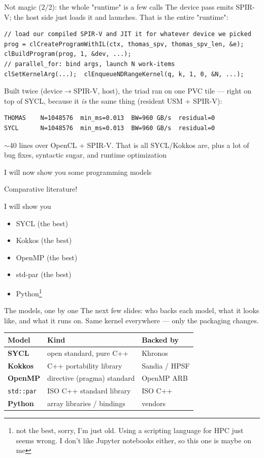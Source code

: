 \begin{frame}[fragile]{Not magic (2/2): the whole "runtime" is a few calls}
The device pass emits SPIR-V; the host side just loads it and launches. That is the
entire "runtime":
\begin{verbatim}
// load our compiled SPIR-V and JIT it for whatever device we picked
prog = clCreateProgramWithIL(ctx, thomas_spv, thomas_spv_len, &e);
clBuildProgram(prog, 1, &dev, ...);
// parallel_for: bind args, launch N work-items
clSetKernelArg(...);  clEnqueueNDRangeKernel(q, k, 1, 0, &N, ...);
\end{verbatim}
Built twice (device$\rightarrow$SPIR-V, host), the triad ran on one PVC tile ---
right on top of SYCL, because it \emph{is} the same thing (resident USM + SPIR-V):
\begin{verbatim}
THOMAS    N=1048576  min_ms=0.013  BW=960 GB/s  residual=0
SYCL      N=1048576  min_ms=0.013  BW=960 GB/s  residual=0
\end{verbatim}
\alert{$\sim$40 lines over OpenCL + SPIR-V. That is all SYCL/Kokkos are, plus a lot of bug fixes, syntactic sugar, and runtime optimization}
\end{frame}


\begin{frame}{I will now show you some programming models}

Comparative literature!

I will show you
\begin{itemize}
    \item SYCL (the best)
    \item Kokkos (the best)
    \item OpenMP (the best)
    \item  std-par (the best)
    \item Python\footnote{not the best, sorry, I'm just old. Using a scripting language for HPC just seems wrong. I don't like Jupyter notebooks either, so this one is maybe on me}
\end{itemize}

\end{frame}


\begin{frame}{The models, one by one}
The next few slides: who backs each model, what it looks like, and what it runs
on. Same kernel everywhere --- only the packaging changes.
\begin{center}\small
\begin{tabular}{@{}lll@{}}
\toprule
Model & Kind & Backed by \\
\midrule
\textbf{SYCL}       & open standard, pure C++      & Khronos \\
\textbf{Kokkos}     & C++ portability library      & Sandia / HPSF \\
\textbf{OpenMP}     & directive (pragma) standard  & OpenMP ARB \\
\texttt{std::par}   & ISO C++ standard library     & ISO C++ \\
\textbf{Python}     & array libraries / bindings   & vendors \\
\bottomrule
\end{tabular}
\end{center}
\end{frame}

